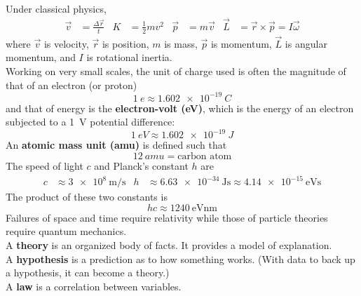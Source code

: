 \documentclass{subfiles}
\begin{document}
	Under classical physics,
		\begin{align*}
			\vec{v} &= \frac{\Delta\vec{r}}{t} &	
				K &= \frac{1}{2}mv^2 &
				\vec{p} &= m\vec{v} & 
				\vec{L} &= \vec{r} \times \vec{p}
					= I\vec{\omega}
		\end{align*}
		where \(\vec{v}\) is velocity, \(\vec{r}\) is position, \(m\) is mass, \(\vec{p}\) is momentum, \(\vec{L}\) is angular momentum, and \(I\) is rotational inertia. \\
	Working on very small scales, the unit of charge used is often the magnitude of that of an electron (or proton)
		\[\SI{1}{e} \approx \SI{1.602e-19}{C}\]
		and that of energy is the \textbf{electron-volt (eV)}, which is the energy of an electron subjected to a \SI{1}{V} potential difference:
		\[\SI{1}{eV} \approx \SI{1.602e-19}{J}\]
		An \textbf{atomic mass unit (amu)} is defined such that
		\[\SI{12}{amu} = \text{carbon atom}\]
		The speed of light \(c\) and Planck's constant \(h\) are
		\begin{align*}
			c &\approx \SI[per-mode = fraction]{3e8}{\m\per\s} &
				h &\approx \SI{6.63e-34}{\J\s}
					\approx \SI{4.14e-15}{\eV\s}
		\end{align*}
		The product of these two constants is
		\[hc \approx \SI{1240}{\eV\nm}\]
	Failures of space and time require relativity while those of particle theories require quantum mechanics. \\
	A \textbf{theory} is an organized body of facts. It provides a model of explanation. \\
	A \textbf{hypothesis} is a prediction as to how something works. (With data to back up a hypothesis, it can become a theory.) \\
	A \textbf{law} is a correlation between variables.
\end{document}
